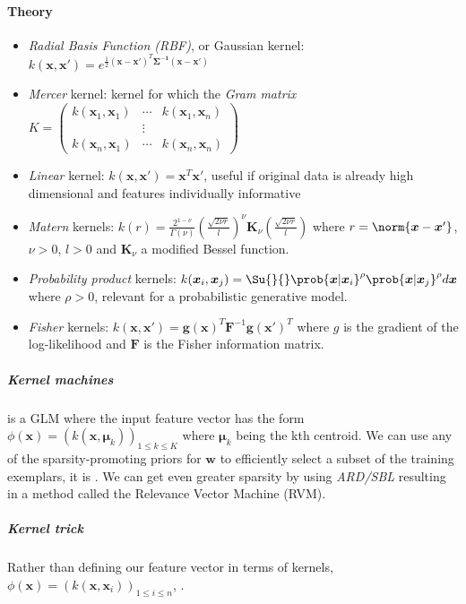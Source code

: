 \paragraph{Theory}
\begin{itemize}
    \item \emph{Radial Basis Function (RBF)}, or Gaussian kernel:  $k(\bm{x}, \bm{x}')
        = e^{\frac{1}{2}(\bm{x} - \bm{x}')^{T}\bm{\Sigma^{-1}}(\bm{x} - \bm{x}')}$
    \item \emph{Mercer} kernel: kernel for which the \emph{Gram matrix} 
        $K=\begin{pmatrix}
            k(\bm{x}_{1}, \bm{x}_{1}) & \cdots & k(\bm{x}_{1}, \bm{x}_{n}) \\
                                      & \vdots &\\
            k(\bm{x}_{n}, \bm{x}_{1}) & \cdots & k(\bm{x}_{n}, \bm{x}_{n}) 
        \end{pmatrix}$ 
    \item \emph{Linear} kernel: $k(\bm{x},\bm{x}') = \bm{x}^{T}\bm{x}'$, useful if 
        original data is already high dimensional and features individually informative
    \item \emph{Matern} kernels: $k(r) = \frac{2^{1-\nu}}{\Gamma(\nu)}\left(\frac{
        \sqrt{2\nu r}}{l}\right)^{\nu}\bm{K}_{\nu}\left(\frac{\sqrt{2\nu r}}{l}\right)$
        where $r=\norm{\bm{x} - \bm{x}'}$, $\nu >0$, $l>0$ and $\bm{K}_{\nu}$ a 
        modified Bessel function. 
    \item \emph{Probability product} kernels: $k(\bm{x}_{i},\bm{x}_{j}) = 
        \Su{}{}\prob{\bm{x}|\bm{x}_{i}}^{\rho}\prob{\bm{x}|\bm{x}_{j}}^{\rho}d\bm{x}$
        where $\rho > 0$, relevant for a probabilistic generative model.
    \item \emph{Fisher} kernels: $k(\bm{x},\bm{x}') = \bm{g}(\bm{x})^{T}\bm{F}^{-1}
        \bm{g}(\bm{x}')^{T}$ where $g$ is the gradient of the log-likelihood and 
        $\bm{F}$ is the Fisher information matrix. 
\end{itemize}
\subparagraph{Kernel machines}
is a GLM where the input feature vector has the form $\phi(\bm{x}) = \left(
k(\bm{x}, \bm{\mu}_{k})\right)_{1\leq k\leq K}$ where $\bm{\mu}_{k}$ being the kth 
centroid.
We can use any of the sparsity-promoting priors for $\bm{w}$ to efficiently select a 
subset of the training exemplars, it is .
We can get even greater sparsity by using \emph{ARD/SBL} resulting in a method called
the Relevance Vector Machine (RVM).
\subparagraph{Kernel trick}
Rather than defining our feature vector in terms of kernels, $\phi(\bm{x}) = \left(
k(\bm{x},\bm{x}_{i})\right)_{1\leq i\leq n}$, .

